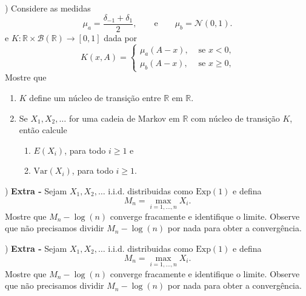 \documentclass{article}
\newcommand*\1{\mathds{1}}
\begin{document}
\newpage

) Considere as medidas
\begin{equation}
  \mu_a = \frac{\delta_{-1} + \delta_1}{2}, \qquad \text{e} \qquad \mu_b = \mathcal{N}(0, 1).
\end{equation}
e $K:\mathbb{R} \times \mathcal{B}(\mathbb{R}) \to [0,1]$ dada por
  \begin{equation}
    K(x, A) =
    \begin{cases}
      \mu_a (A - x), & \text{ se $x < 0$,}\\
      \mu_b (A - x), & \text{ se $x \geq 0$,}
    \end{cases}
  \end{equation}
Mostre que
\begin{enumerate}[\quad a)]
\item $K$ define um núcleo de transição entre $\mathbb{R}$ em $\mathbb{R}$.
\item Se $X_1, X_2, \dots$ for uma cadeia de Markov em $\mathbb{R}$ com núcleo de transição $K$, então calcule
  \begin{enumerate}[\qquad i)]
  \item $E(X_i)$, para todo $i \geq 1$ e
  \item $\text{Var}(X_i)$, para todo $i \geq 1$.
  \end{enumerate}
\end{enumerate}

\newpage

) {\bf Extra -} Sejam $X_1, X_2, \dots$ i.i.d. distribuidas como $\text{Exp}(1)$ e defina
\begin{equation}
  M_n = \max_{i = 1, \dots, n} X_i.
\end{equation}
Mostre que $M_n - \log(n)$ converge fracamente e identifique o limite.
Observe que não precisamos dividir $M_n - \log(n)$ por nada para obter a convergência.

\medskip
\medskip
\medskip

) {\bf Extra -} Sejam $X_1, X_2, \dots$ i.i.d. distribuidas como $\text{Exp}(1)$ e defina
\begin{equation}
  M_n = \max_{i = 1, \dots, n} X_i.
\end{equation}
Mostre que $M_n - \log(n)$ converge fracamente e identifique o limite.
Observe que não precisamos dividir $M_n - \log(n)$ por nada para obter a convergência.
\end{document}
